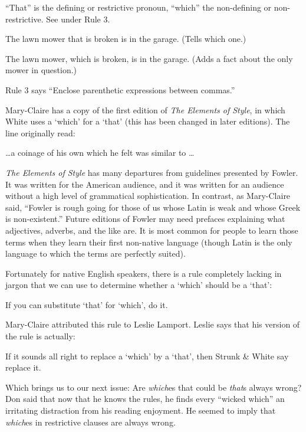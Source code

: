 {\narrower\smallskip\noindent
``That'' is the defining or restrictive pronoun, ``which'' the non-defining
    or non-restrictive.  See under Rule 3.
\smallskip}

{\narrower\narrower\smallskip\noindent
        The lawn mower that is broken is in the garage.  (Tells which one.)

        The lawn mower, which is broken, is in the garage.  (Adds
        a fact about the only mower in question.)
\smallskip}

Rule 3 says ``Enclose parenthetic expressions between commas.''

Mary-Claire has a copy of the first edition of {\sl The Elements of Style}, in
which White uses a `which' for a `that' 
(this has been changed in later
editions).  The line originally read:

{\narrower\smallskip\noindent
\dots a coinage of his own which he felt was similar to \dots
\smallskip}

{\sl The Elements of Style\/} has many departures from guidelines presented by
Fowler.  It was written for the American audience, and it was written for
an audience without a high level of grammatical sophistication.  In
contrast, as Mary-Claire said, ``Fowler is rough going for those of us
whose Latin is weak and whose Greek is non-existent.''  Future editions of
Fowler may need prefaces explaining what adjectives, adverbs, and the like
are. It is most common for people to learn those terms when they learn
their first non-native language (though Latin is the only language to
which the terms are perfectly suited).

Fortunately for native English speakers, there is a rule completely
lacking in jargon that we can use to determine whether a `which' should be
a `that': 

{\narrower\smallskip\noindent
   If you can substitute `that' for `which', do it.  
\smallskip}

Mary-Claire attributed this rule to Leslie Lamport.  Leslie says that his
version of the rule is actually: 

{\narrower\smallskip\noindent
   If it sounds all right to replace a `which' by a `that',   
   then Strunk \& White say replace it.
\smallskip}

Which brings us to our next issue: Are {\it which\/}es that could be 
{\it that\/}s always
wrong?  Don said that now that he knows the rules, he finds every ``wicked
which'' an irritating distraction from his reading
enjoyment.  He seemed to imply that {\it which\/}es in restrictive
clauses are always wrong.  

